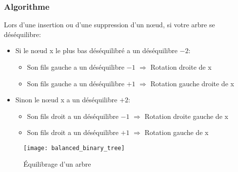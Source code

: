 \documentclass[11pt]{extarticle}
\begin{document}
\subsubsection{Algorithme}
Lors d'une insertion ou d'une suppression d'un nœud, si votre arbre se déséquilibre:
\begin{itemize}
\item Si le nœud x le plus bas déséquilibré a un déséquilibre $-2$:
\begin{itemize}
\item Son fils gauche a un déséquilibre $-1$ $\Rightarrow$ Rotation droite de x
\item Son fils gauche a un déséquilibre $+1$ $\Rightarrow$ Rotation gauche droite de x
\end{itemize}
\item Sinon le nœud x a un déséquilibre $+2$:
\begin{itemize}
\item Son fils droit a un déséquilibre $-1$ $\Rightarrow$ Rotation droite gauche de x
\item Son fils droit a un déséquilibre $+1$ $\Rightarrow$ Rotation gauche de x
\end{itemize}
\end{itemize}\vspace{1cm}
\begin{figure}[H]
\centering
\texttt{[image: balanced\_binary\_tree]}
\caption{Équilibrage d'un arbre}
\end{figure}
\end{document}
